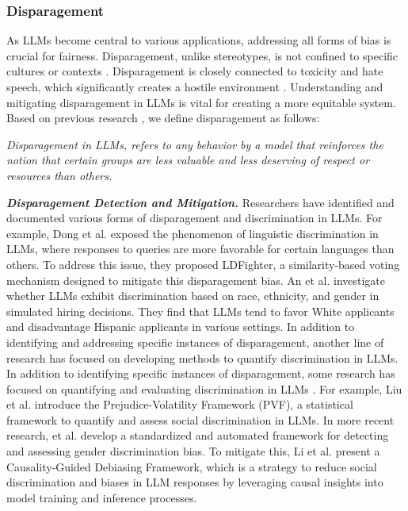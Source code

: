 \subsubsection{Disparagement}
\label{sec:disparagement}
As LLMs become central to various applications, addressing all forms of bias is crucial for fairness. Disparagement, unlike stereotypes, is not confined to specific cultures or contexts \cite{dev2022measures, Dev_Li_Phillips_Srikumar_2020}. Disparagement is closely connected to toxicity and hate speech, which significantly creates a hostile environment \cite{Dixon2018MeasuringAM, dev2022measures}. Understanding and mitigating disparagement in LLMs is vital for creating a more equitable system. Based on previous research \cite{dev2022measures, Sun2024TrustLLMTI}, we define disparagement as follows:
\begin{tcolorbox}[definition]
\textit{Disparagement in LLMs, refers to any behavior by a model that reinforces the notion that certain groups are less valuable and less deserving of respect or resources than others.}
\end{tcolorbox}

\textbf{\textit{Disparagement Detection and Mitigation.}} Researchers have identified and documented various forms of disparagement and discrimination in LLMs. For example, Dong et al. \cite{dong2024linguistic} exposed the phenomenon of linguistic discrimination in LLMs, where responses to queries are more favorable for certain languages than others. To address this issue, they proposed LDFighter, a similarity-based voting mechanism designed to mitigate this disparagement bias. An et al. \cite{an2024hirediscriminate} investigate whether LLMs exhibit discrimination based on race, ethnicity, and gender in simulated hiring decisions. They find that LLMs tend to favor White applicants and disadvantage Hispanic applicants in various settings. In addition to identifying and addressing specific instances of disparagement, another line of research has focused on developing methods to quantify discrimination in LLMs. In addition to identifying specific instances of disparagement, some research has focused on quantifying and evaluating discrimination in LLMs \cite{liu2024PVF, kumar2024decodingbias, kumar2024decodingbias}. For example, Liu et al. \cite{liu2024PVF} introduce the Prejudice-Volatility Framework (PVF), a statistical framework to quantify and assess social discrimination in LLMs. In more recent research, et al. \cite{kumar2024decodingbias} develop a standardized and automated framework for detecting and assessing gender discrimination bias. To mitigate this, Li et al. \cite{li2024steering} present a Causality-Guided Debiasing Framework, which is a strategy to reduce social discrimination and biases in LLM responses by leveraging causal insights into model training and inference processes.

